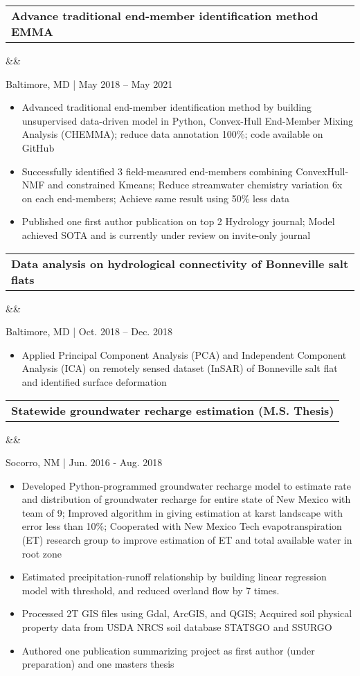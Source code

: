 \documentclass[12pt,letterpaper,sans]{moderncv}        %
\makeatletter
\newcommand*{\customcvproject}[4][.25em]{
  \begin{tabular}{@{}l} 
    {\bfseries #2} { #3}
  \end{tabular}


      

  \ifx&#4&%
  \else{\\%
    \begin{minipage}{\maincolumnwidth}%
      \small#4%
    \end{minipage}}\fi%
  \par\addvspace{#1}}
\makeatother
\begin{document}
{%
{\customcvproject{Advance traditional end-member identification method EMMA}{}
{}
}
Baltimore, MD | May 2018 – May 2021
\begin{itemize}
\item Advanced traditional end-member identification method by building unsupervised data-driven model in Python, Convex-Hull End-Member Mixing Analysis (CHEMMA); reduce data annotation 100\%; code available on GitHub
\item Successfully identified 3 field-measured end-members combining ConvexHull-NMF and constrained Kmeans; Reduce streamwater chemistry variation 6x on each end-members; Achieve same result using 50\% less data
\item Published one first author publication \cite{xufei} on top 2 Hydrology journal; Model achieved SOTA and is currently under review on invite-only journal
\end{itemize}

{\customcvproject{Data analysis on hydrological connectivity of Bonneville salt flats}{}
{}
}
Baltimore, MD | Oct. 2018 – Dec. 2018
\begin{itemize}
  \item Applied Principal Component Analysis (PCA) and Independent Component Analysis (ICA) on remotely sensed dataset (InSAR) of Bonneville salt flat and identified surface deformation
\end{itemize}

{\customcvproject{Statewide groundwater recharge estimation (M.S. Thesis)}{}{}}
Socorro, NM | Jun. 2016 - Aug. 2018
\begin{itemize}
    \item Developed Python-programmed groundwater recharge model to estimate rate and distribution of groundwater recharge for entire state of New Mexico with team of 9; Improved algorithm in giving estimation at karst landscape with error less than 10\%; Cooperated with New Mexico Tech evapotranspiration (ET) research group to improve estimation of ET and total available water in root zone
    \item Estimated precipitation-runoff relationship by building linear regression model with threshold, and reduced overland flow by 7 times.
    \item Processed 2T GIS files using Gdal, ArcGIS, and QGIS; Acquired soil physical property data from USDA NRCS soil database STATSGO and SSURGO
    \item Authored one publication summarizing project as first author (under preparation) and one masters thesis \cite{masterthesis}
  \end{itemize}
  
}
\end{document}
